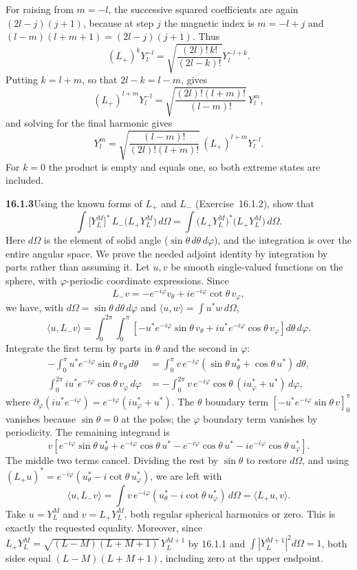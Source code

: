 For raising from $m=-l$, the successive squared coefficients are
again $(2l-j)(j+1)$, because at step $j$ the magnetic index is
$m=-l+j$ and $(l-m)(l+m+1)=(2l-j)(j+1)$.
Thus
\[
(L_+)^kY_l^{-l}
=\sqrt{\frac{(2l)!\,k!}{(2l-k)!}}Y_l^{-l+k}.
\]
Putting $k=l+m$, so that $2l-k=l-m$, gives
\[
(L_+)^{l+m}Y_l^{-l}
=\sqrt{\frac{(2l)!(l+m)!}{(l-m)!}}\,Y_l^m,
\]
and solving for the final harmonic gives
\[
\boxed{Y_l^m=\sqrt{\frac{(l-m)!}{(2l)!(l+m)!}}\,
(L_+)^{l+m}Y_l^{-l}}.
\]
For $k=0$ the product is empty and equals one, so both extreme
states are included.

\par\bigskip
\noindent\textbf{16.1.3}\quad Using the known forms of $L_{+}$ and
$L_{-}$ (Exercise~16.1.2), show that
\[
\int\big[Y_{L}^{M}\big]^{*}\,L_{-}\big(L_{+}Y_{L}^{M}\big)\,d\Omega
=\int\big(L_{+}Y_{L}^{M}\big)^{*}\big(L_{+}Y_{L}^{M}\big)\,d\Omega.
\]
Here $d\Omega$ is the element of solid angle
($\sin\theta\,d\theta\,d\varphi$), and the integration is over the
entire angular space.
\solution
We prove the needed adjoint identity by integration by parts rather
than assuming it. Let $u,v$ be smooth single-valued functions on the
sphere, with $\varphi$-periodic coordinate expressions. Since
\[
L_-v=-e^{-i\varphi}v_\theta
+i e^{-i\varphi}\cot\theta\,v_\varphi,
\]
we have, with $d\Omega=\sin\theta\,d\theta\,d\varphi$ and
$\langle u,w\rangle=\int u^*w\,d\Omega$,
\[
\langle u,L_-v\rangle
=\int_0^{2\pi}\int_0^\pi
\left[-u^*e^{-i\varphi}\sin\theta\,v_\theta
+i u^*e^{-i\varphi}\cos\theta\,v_\varphi\right]d\theta\,d\varphi.
\]
Integrate the first term by parts in $\theta$ and the second in
$\varphi$:
\[
\begin{aligned}
-\int_0^\pi u^*e^{-i\varphi}\sin\theta\,v_\theta\,d\theta
&=\int_0^\pi v\,e^{-i\varphi}
(\sin\theta\,u_\theta^*+\cos\theta\,u^*)\,d\theta,\\
\int_0^{2\pi}iu^*e^{-i\varphi}\cos\theta\,v_\varphi\,d\varphi
&=-\int_0^{2\pi}v\,e^{-i\varphi}\cos\theta\,
(iu_\varphi^*+u^*)\,d\varphi,
\end{aligned}
\]
where $\partial_\varphi(iu^*e^{-i\varphi})
=e^{-i\varphi}(iu_\varphi^*+u^*)$.
The $\theta$ boundary term $[-u^*e^{-i\varphi}\sin\theta\,v]_0^\pi$
vanishes because $\sin\theta=0$ at the poles; the $\varphi$ boundary
term vanishes by periodicity. The remaining integrand is
\[
v\left[
e^{-i\varphi}\sin\theta\,u_\theta^*
+e^{-i\varphi}\cos\theta\,u^*
-e^{-i\varphi}\cos\theta\,u^*
-i e^{-i\varphi}\cos\theta\,u_\varphi^*
\right].
\]
The middle two terms cancel. Dividing the rest by $\sin\theta$ to
restore $d\Omega$, and using
$(L_+u)^*=e^{-i\varphi}(u_\theta^*-i\cot\theta\,u_\varphi^*)$,
we are left with
\[
\langle u,L_-v\rangle
=\int v\,e^{-i\varphi}(u_\theta^*
-i\cot\theta\,u_\varphi^*)\,d\Omega
=\langle L_+u,v\rangle.
\]
Take $u=Y_L^M$ and $v=L_+Y_L^M$, both regular spherical harmonics
or zero. This is exactly the requested equality. Moreover, since
$L_+Y_L^M=\sqrt{(L-M)(L+M+1)}\,Y_L^{M+1}$ by 16.1.1 and
$\int|Y_L^{M+1}|^2d\Omega=1$, both sides equal
$\boxed{(L-M)(L+M+1)}$, including zero at the upper endpoint.

